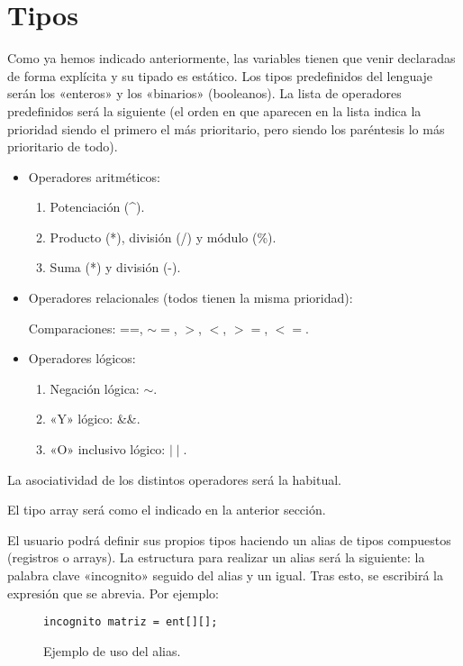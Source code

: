 \section*{Tipos}
Como ya hemos indicado anteriormente, las variables tienen que venir declaradas
de forma explícita y su tipado es estático. Los tipos predefinidos del lenguaje
serán los «enteros» y los «binarios» (booleanos). La lista de operadores
predefinidos será la siguiente (el orden en que aparecen en la lista indica la
prioridad siendo el primero el más prioritario, pero siendo los paréntesis lo
más prioritario de todo).
\begin{itemize}
\item Operadores aritméticos:
    \begin{enumerate}
        \item Potenciación (\^{}).
        \item Producto (*), división (/) y módulo (\%).
        \item Suma (*) y división (-).
    \end{enumerate}
\item Operadores relacionales (todos tienen la misma prioridad):

Comparaciones: ==, $\sim =$, $>$, $<$, $>=$, $<=$.

\item Operadores lógicos:
\begin{enumerate}
    \item Negación lógica: $\sim$.
    \item «Y» lógico: \&\&.
    \item «O» inclusivo lógico: $\mid \mid$.
\end{enumerate}
\end{itemize}
La asociatividad de los distintos operadores será la habitual.

El tipo array será como el indicado en la anterior sección.

El usuario podrá definir sus propios tipos haciendo un alias de tipos
compuestos (registros o arrays). La estructura para realizar un alias será la
siguiente: la palabra clave «incognito» seguido del alias y un igual. Tras esto,
se escribirá la expresión que se abrevia. Por ejemplo:
\begin{figure}[H]
    \centering
    \begin{lstlisting}
incognito matriz = ent[][];
    \end{lstlisting}
    \caption{Ejemplo de uso del alias.}
\end{figure}
